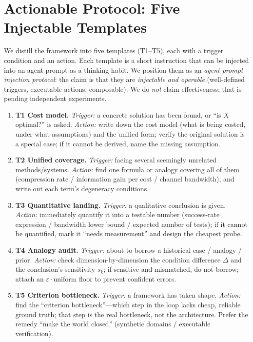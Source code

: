 \documentclass[11pt]{article}
\begin{document}
\section{Actionable Protocol: Five Injectable Templates}
\label{sec:protocol}

We distill the framework into five templates (T1--T5), each with a trigger
condition and an action. Each template is a short instruction that can be
injected into an agent prompt as a thinking habit. We position them as an
\emph{agent-prompt injection protocol}: the claim is that they are
\emph{injectable and operable} (well-defined triggers, executable actions,
composable). We do \emph{not} claim effectiveness; that is pending independent
experiments.

\begin{enumerate}[leftmargin=2em,itemsep=2pt]
\item \textbf{T1 Cost model.} \emph{Trigger:} a concrete solution has been
found, or ``is $X$ optimal?'' is asked. \emph{Action:} write down the cost model
(what is being costed, under what assumptions) and the unified form; verify the
original solution is a special case; if it cannot be derived, name the missing
assumption.
\item \textbf{T2 Unified coverage.} \emph{Trigger:} facing several seemingly
unrelated methods/systems. \emph{Action:} find one formula or analogy covering
all of them (compression rate / information gain per cost / channel bandwidth),
and write out each term's degeneracy conditions.
\item \textbf{T3 Quantitative landing.} \emph{Trigger:} a qualitative conclusion
is given. \emph{Action:} immediately quantify it into a testable number
(success-rate expression / bandwidth lower bound / expected number of tests); if
it cannot be quantified, mark it ``needs measurement'' and design the cheapest
probe.
\item \textbf{T4 Analogy audit.} \emph{Trigger:} about to borrow a historical
case / analogy / prior. \emph{Action:} check dimension-by-dimension the
condition difference $\Delta$ and the conclusion's sensitivity $s_k$; if
sensitive and mismatched, do not borrow; attach an $\varepsilon\cdot$uniform
floor to prevent confident errors.
\item \textbf{T5 Criterion bottleneck.} \emph{Trigger:} a framework has taken
shape. \emph{Action:} find the ``criterion bottleneck''---which step in the loop
lacks cheap, reliable ground truth; that step is the real bottleneck, not the
architecture. Prefer the remedy ``make the world closed'' (synthetic domains /
executable verification).
\end{enumerate}
\end{document}
